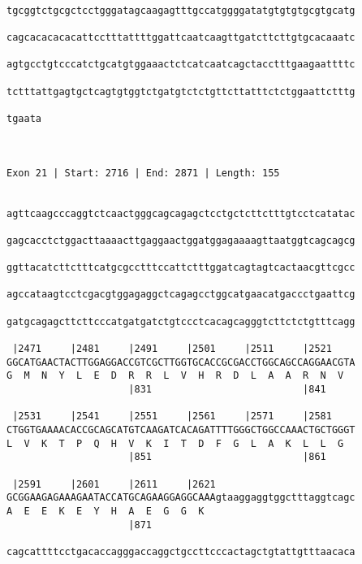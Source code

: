 \documentclass{article}
\begin{document}
\begin{Verbatim}
  
tgcggtctgcgctcctgggatagcaagagtttgccatggggatatgtgtgtgcgtgcatg
                                                            
cagcacacacacattcctttattttggattcaatcaagttgatcttcttgtgcacaaatc
                                                            
agtgcctgtcccatctgcatgtggaaactctcatcaatcagctacctttgaagaattttc
                                                            
tctttattgagtgctcagtgtggtctgatgtctctgttcttatttctctggaattctttg
                                                            
tgaata
      
      
 
Exon 21 | Start: 2716 | End: 2871 | Length: 155


agttcaagcccaggtctcaactgggcagcagagctcctgctcttctttgtcctcatatac
                                                            
gagcacctctggacttaaaacttgaggaactggatggagaaaagttaatggtcagcagcg
                                                            
ggttacatcttctttcatgcgcctttccattctttggatcagtagtcactaacgttcgcc
                                                            
agccataagtcctcgacgtggagaggctcagagcctggcatgaacatgaccctgaattcg
                                                            
gatgcagagcttcttcccatgatgatctgtccctcacagcagggtcttctctgtttcagg
                                                            
 |2471     |2481     |2491     |2501     |2511     |2521    
GGCATGAACTACTTGGAGGACCGTCGCTTGGTGCACCGCGACCTGGCAGCCAGGAACGTA
G  M  N  Y  L  E  D  R  R  L  V  H  R  D  L  A  A  R  N  V  
                     |831                          |841     
  
 |2531     |2541     |2551     |2561     |2571     |2581    
CTGGTGAAAACACCGCAGCATGTCAAGATCACAGATTTTGGGCTGGCCAAACTGCTGGGT
L  V  K  T  P  Q  H  V  K  I  T  D  F  G  L  A  K  L  L  G  
                     |851                          |861     
  
 |2591     |2601     |2611     |2621                        
GCGGAAGAGAAAGAATACCATGCAGAAGGAGGCAAAgtaaggaggtggctttaggtcagc
A  E  E  K  E  Y  H  A  E  G  G  K                          
                     |871                                   
  
cagcattttcctgacaccagggaccaggctgccttcccactagctgtattgtttaacaca
                                                            

\end{Verbatim}
\end{document}
